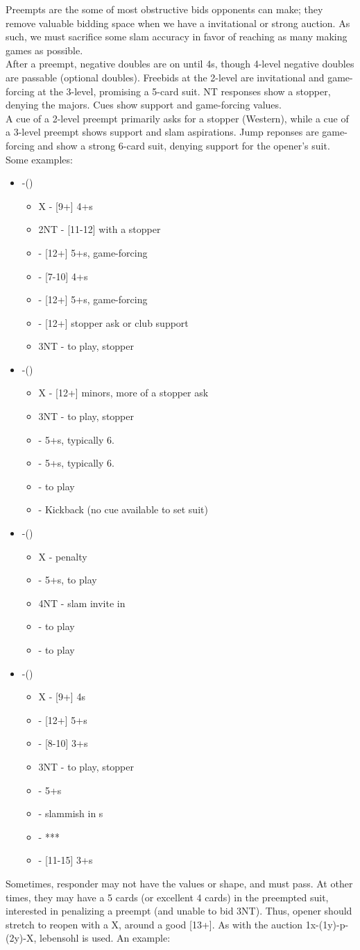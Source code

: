 \documentclass[12pt]{report}
\newcommand{\n}{\\}
\newcommand{\q}[1]{\multido{}{#1}{\qquad}}
\newcommand{\ul}[1]{\begin{itemize}#1\end{itemize}}
\newcommand{\li}[1]{\item[~] \q{#1}}
\begin{document}
    Preempts are the some of most obstructive bids opponents can make; they remove valuable bidding space when we have a invitational or strong auction.  As such, we must sacrifice some slam accuracy in favor of reaching as many making games as possible.\n

    After a preempt, negative doubles are on until 4\he{}s, though 4-level negative doubles are passable (optional doubles).  Freebids at the 2-level are invitational and game-forcing at the 3-level, promising a 5-card suit. NT responses show a stopper, denying the majors.  Cues show support and game-forcing values. \n

    A cue of a 2-level preempt primarily asks for a stopper (Western), while a cue of a 3-level preempt shows support and slam aspirations.  Jump reponses are game-forcing and show a strong 6-card suit, denying support for the opener's suit.  Some examples:

    \ul{
        \li0 -() \ul{
            \li0 X - [9+] 4+\he{}s
            \li0 2NT - [11-12] with a stopper
            \li0 \cl3 - [12+] 5+\cl{}s, game-forcing
            \li0 \di3 - [7-10] 4+\di{}s
            \li0 \he3 - [12+] 5+\he{}s, game-forcing
            \li0 \sp3 - [12+] stopper ask or club support
            \li0 3NT - to play, stopper
        }

        \li0 \he1-(\sp3) \ul{
            \li0 X - [12+] minors, more of a stopper ask
            \li0 3NT - to play, stopper
            \li0 \cl4 - 5+\cl{}s, typically 6.
            \li0 \di4 - 5+\di{}s, typically 6.
            \li0 \he4 - to play
            \li0 \sp4 - Kickback (no cue available to set suit)
        }

        \li0 \cl1-(\he4) \ul{
            \li0 X - penalty
            \li0 \sp4 - 5+\sp{}s, to play
            \li0 4NT - slam invite in \cl{}
            \li0 \cl5 - to play
            \li0 \di5 - to play
        }

        \li0 \sp1-(\di3) \ul{
            \li0 X - [9+] 4\he{}s
            \li0 \he3 - [12+] 5+\he{}s
            \li0 \sp3 - [8-10] 3+\sp{}s
            \li0 3NT - to play, stopper
            \li0 \cl4 - 5+\cl{}s
            \li0 \di4 - slammish in \sp{}s
            \li0 \he4 - ***
            \li0 \sp4 - [11-15] 3+\sp{}s
        }
    }

    Sometimes, responder may not have the values or shape, and must pass.  At other times, they may have a 5 cards (or excellent 4 cards) in the preempted suit, interested in penalizing a preempt (and unable to bid 3NT).  Thus, opener should stretch to reopen with a X, around a good [13+].  As with the auction 1x-(1y)-p-(2y)-X, lebensohl is used.  An example:
\end{document}
